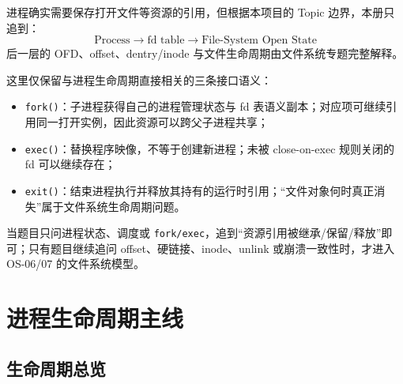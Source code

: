 \documentclass[11pt,a4paper]{ctexart}
\newcommand{\code}[1]{\texttt{#1}}
\begin{document}
进程确实需要保存打开文件等资源的引用，但根据本项目的 Topic 边界，本册只追到：
\[
\boxed{\text{Process}\rightarrow\text{fd table}\rightarrow\text{File-System Open State}}
\]
后一层的 OFD、offset、dentry/inode 与文件生命周期由文件系统专题完整解释。

这里仅保留与进程生命周期直接相关的三条接口语义：
\begin{itemize}
\item \code{fork()}：子进程获得自己的进程管理状态与 fd 表语义副本；对应项可继续引用同一打开实例，因此资源可以跨父子进程共享；
\item \code{exec()}：替换程序映像，不等于创建新进程；未被 close-on-exec 规则关闭的 fd 可以继续存在；
\item \code{exit()}：结束进程执行并释放其持有的运行时引用；“文件对象何时真正消失”属于文件系统生命周期问题。
\end{itemize}

\begin{method}
当题目只问进程状态、调度或 \code{fork/exec}，追到“资源引用被继承/保留/释放”即可；只有题目继续追问 offset、硬链接、inode、unlink 或崩溃一致性时，才进入 OS-06/07 的文件系统模型。
\end{method}

\section{进程生命周期主线}

\subsection{生命周期总览}
\end{document}
